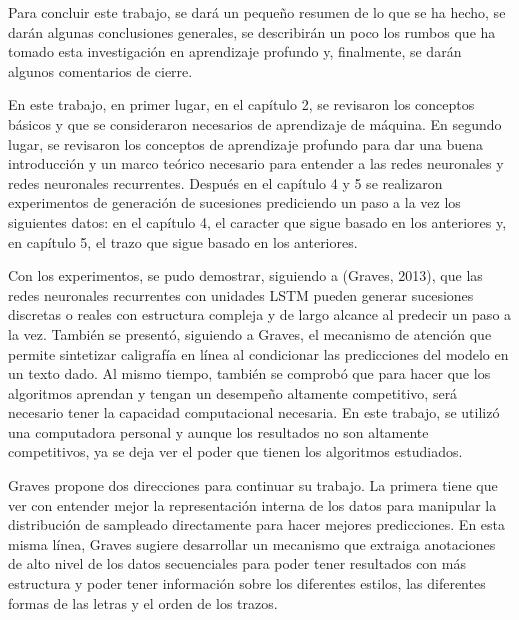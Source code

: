 Para concluir este trabajo, se dará un pequeño resumen de lo que se ha hecho, se darán algunas conclusiones generales, se describirán un poco los rumbos que ha tomado esta investigación en aprendizaje profundo y, finalmente, se darán algunos comentarios de cierre.

\vspace{1em}

En este trabajo, en primer lugar, en el capítulo 2, se revisaron los conceptos básicos y que se consideraron necesarios de aprendizaje de máquina. En segundo lugar, se revisaron los conceptos de aprendizaje profundo para dar una buena introducción y un marco teórico necesario para entender a las redes neuronales y redes neuronales recurrentes. Después en el capítulo 4 y 5 se realizaron experimentos de generación de sucesiones prediciendo un paso a la vez los siguientes datos: en el capítulo 4, el caracter que sigue basado en los anteriores y, en capítulo 5, el trazo que sigue basado en los anteriores.

\vspace{1em}

Con los experimentos, se pudo demostrar, siguiendo a (Graves, 2013), que las redes neuronales recurrentes con unidades LSTM pueden generar sucesiones discretas o reales con estructura compleja y de largo alcance al predecir un paso a la vez. También se presentó, siguiendo a Graves, el mecanismo de atención que permite sintetizar caligrafía en línea al condicionar las predicciones del modelo en un texto dado. Al mismo tiempo, también se comprobó que para hacer que los algoritmos aprendan y tengan un desempeño altamente competitivo, será necesario tener la capacidad computacional necesaria. En este trabajo, se utilizó una computadora personal y aunque los resultados no son altamente competitivos, ya se deja ver el poder que tienen los algoritmos estudiados.
\cite{DBLP:journals/corr/Graves13}

\vspace{1em}

Graves propone dos direcciones para continuar su trabajo. La primera tiene que ver con entender mejor la representación interna de los datos para manipular la distribución de sampleado directamente para hacer mejores predicciones. En esta misma línea, Graves sugiere desarrollar un mecanismo que extraiga anotaciones de alto nivel de los datos secuenciales para poder tener resultados con más estructura y poder tener información sobre los diferentes estilos, las diferentes formas de las letras y el orden de los trazos.
\cite{DBLP:journals/corr/Graves13}

